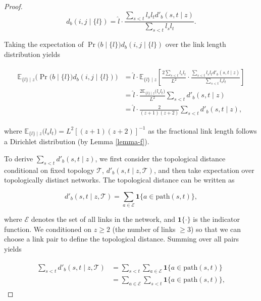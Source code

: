 \documentclass[11pt, class=article, crop=false]{standalone}
\theoremstyle{definition}
\begin{document}
\begin{proof}
\begin{equation}
    d_b(i,j \mid \{l\})
    =
    \hat{l} \cdot \frac{\sum_{s < t} l_s l_t d'_b(s,t \mid z)}{\sum_{s < t} l_s l_t}.
\end{equation}

Taking the expectation of $\Pr \bigl(b \mid \{l\} \bigr) d_b(i,j \mid \{l\})$ over the link length distribution yields

\begin{align}
\begin{split}
    \mathbb{E}_{\{l\} \mid z}
    \bigl(
    \Pr \bigl(b \mid \{l\} \bigr) d_b(i,j \mid \{l\}) 
    \bigr)
    &=
    \hat{l} 
    \cdot
    \mathbb{E}_{\{l\} \mid z}
    \left[
    \frac{2\sum_{s <t } l_s l_t}{L^2}
    \cdot \frac{\sum_{s < t} l_s l_t d'_b(s,t \mid z)}{\sum_{s < t} l_s l_t}
    \right] \\
    &=
    \hat{l}
    \cdot
    \frac{2 \mathbb{E}_{\{l\} \mid z}\bigl(l_s l_t\bigr)}{L^2}
    \sum_{s < t} d'_b(s,t \mid z) \\
    &=
    \hat{l}
    \cdot
    \frac{2}{(z + 1)(z + 2)}
    \sum_{s < t} d'_b(s,t \mid z),
\label{eq:bwdist0}
\end{split}
\end{align}

where $\mathbb{E}_{\{l\} \mid z}\bigl(l_s l_t\bigr) = L^2 [(z+1)(z+2)]^{-1}$ as the fractional link length follows a Dirichlet distribution (by Lemma \ref{lemma-f}).

To derive $\sum_{s < t} d'_b(s,t \mid z)$, we first consider the topological distance conditional on fixed topology $\mathcal{T}$, $d'_b(s,t \mid z, \mathcal{T})$, and then take expectation over topologically distinct networks.
The topological distance can be written as

\begin{equation}
d'_b(s, t \mid z, \mathcal{T})
=
\sum_{a \in \mathcal{E}}
\mathbf{1}\{a \in \mathrm{path}(s,t)\},
\end{equation}

where $\mathcal{E}$ denotes the set of all links in the network, and $\mathbf{1}\{\cdot\}$ is the indicator function.
We conditioned on $z \ge 2$ (the number of links $\ge 3$) so that we can choose a link pair to define the topological distance.
Summing over all pairs yields

\begin{align}
    \begin{split}
    \sum_{s < t} d'_b(s, t \mid z, \mathcal{T})
    &= \sum_{s < t} \sum_{a \in \mathcal{E}} \mathbf{1}\{a \in \mathrm{path}(s,t)\} \\
    &= \sum_{a \in \mathcal{E}} \sum_{s < t} \mathbf{1}\{a \in \mathrm{path}(s,t)\},
    \end{split}
\end{align}


\end{proof}
\end{document}
